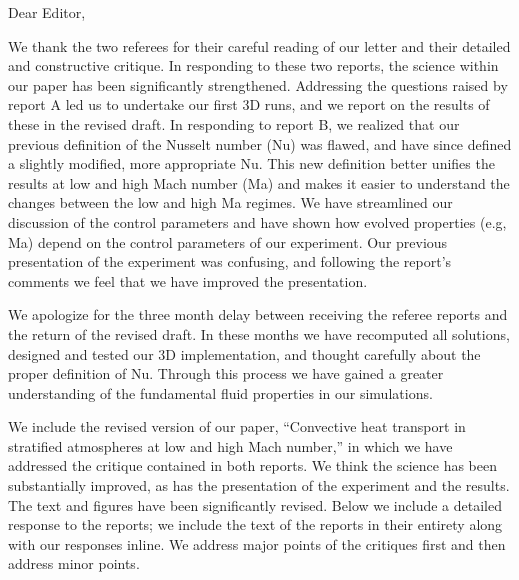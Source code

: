 \documentclass[aps, 11pt, singlecolumn]{revtex4-1} %
\begin{document}
\noindent
Dear Editor,
$\,$\newline

\newenvironment{myquotation}{
\begin{quotation}
\itshape
}{ 
\end{quotation}
}

\begin{singlespace}
We thank the two referees for their careful reading of our letter
and their detailed and constructive critique.
In responding to these two reports, the science within
our paper has been significantly strengthened.
Addressing the questions raised by report A led us to undertake
our first 3D runs, and we report on the results of these in the
revised draft.  In responding to report B,
we realized that our previous definition of the
Nusselt number (Nu) was flawed, and have since defined
a slightly modified, more appropriate Nu.  This new definition better unifies
the results at low and high Mach number (Ma) and makes it easier to understand
the changes between the low and high Ma regimes. We have streamlined our discussion
of the control parameters and have shown how evolved properties (e.g, Ma) depend
on the control parameters of our experiment.  Our previous presentation of the
experiment was confusing, and following the report's comments we feel that we
have improved the presentation.

We apologize for the three month delay between receiving the referee reports
and the return of the revised draft.  In these months we have
recomputed all solutions, designed and tested our 3D implementation, and
thought carefully about the proper definition of Nu.  Through this
process we have gained a greater understanding of the fundamental
fluid properties in our simulations.  


We include the revised version of our paper, ``Convective heat transport in stratified
atmospheres at low and high Mach number,'' in which we have addressed the critique contained
in both reports.  We think the science has been substantially improved, as has
the presentation of the experiment and the results.  The text and figures have been significantly
revised.  
Below we include a detailed response to the reports; we include the text of
the reports in their entirety along with our responses inline.  We address major
points of the critiques first and then address minor points.



\end{singlespace}
\end{document}
